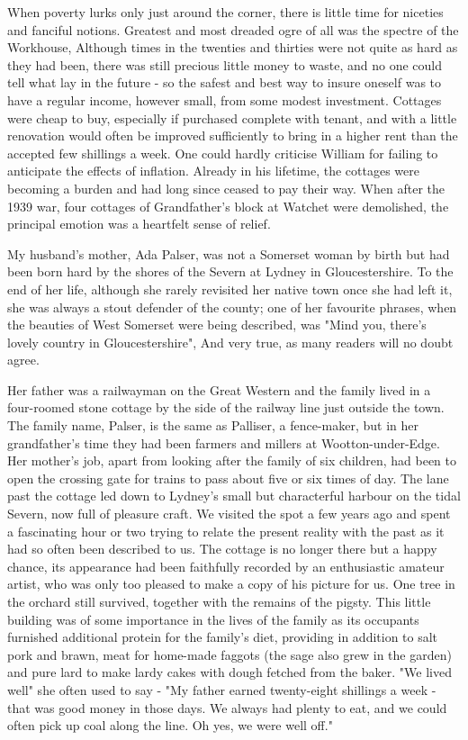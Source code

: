 When poverty lurks only just around the corner, there is little time for niceties and fanciful notions. Greatest and most dreaded ogre of all was the spectre of the Workhouse, Although times in the twenties and thirties were not quite as hard as they had been, there was still precious little money to waste, and no one could tell what lay in the future - so the safest and best way to insure oneself was to have a regular income, however small, from some modest investment. Cottages were cheap to buy, especially if purchased complete with tenant, and with a little renovation would often be improved sufficiently to bring in a higher rent than the accepted few shillings a week. One could hardly criticise William for failing to anticipate the effects of inflation. Already in his lifetime, the cottages were becoming a burden and had long since ceased to pay their way. When after the 1939 war, four cottages of Grandfather’s block at Watchet were demolished, the principal emotion was a heartfelt sense of relief.
 
\Flourish	 

My husband's mother, Ada Palser, was not a Somerset woman by birth but had been born hard by the shores of the Severn at Lydney in Gloucestershire. To the end of her life, although she rarely revisited her native town once she had left it, she was always a stout defender of the county; one of her favourite phrases, when the beauties of West Somerset were being described, was "Mind you, there’s lovely country in Gloucestershire", And very true, as many readers will no doubt agree.

Her father was a railwayman on the Great Western and the family lived in a four-roomed stone cottage by the side of the railway line just outside the town. The family name, Palser, is the same as Palliser, a fence-maker, but in her grandfather's time they had been farmers and millers at Wootton-under-Edge. Her mother's job, apart from looking after the family of six children, had been to open the crossing gate for trains to pass about five or six times of day. The lane past the cottage led down to Lydney's small but characterful harbour on the tidal Severn, now full of pleasure craft. We visited the spot a few years ago and spent a fascinating hour or two trying to relate the present reality with the past as it had so often been described to us. The cottage is no longer there but a happy chance, its appearance had been faithfully recorded by an enthusiastic amateur artist, who was only too pleased to make a copy of his picture for us. One tree in the orchard still survived, together with the remains of the pigsty. This little building was of some importance in the lives of the family as its occupants furnished additional protein for the family's diet, providing in addition to salt pork and brawn, meat for home-made faggots (the sage also grew in the garden) and pure lard to make lardy cakes with dough fetched from the baker. "We lived well" she often used to say - "My father earned twenty-eight shillings a week - that was good money in those days. We always had plenty to eat, and we could often pick up coal along the line. Oh yes, we were well off."

